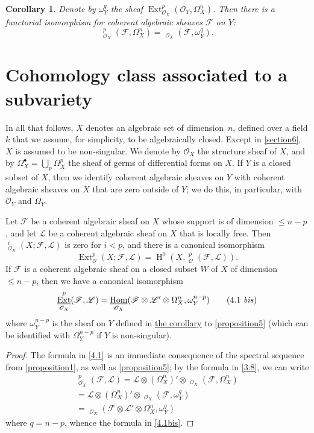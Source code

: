 \documentclass{article}
\theoremstyle{plain}
\newenvironment{lemma}[1]
    {\renewcommand\theinnercustomlemma{#1}\innercustomlemma}
    {\endinnercustomlemma}
\newtheorem*{corollary*}{Corollary}
\theoremstyle{definition}
\newcommand{\sh}{\mathscr}
\renewcommand{\leq}{\leqslant}
\DeclareMathOperator{\Ext}{Ext}
\DeclareMathOperator{\shExt}{\underline{Ext}}
\DeclareMathOperator{\shHom}{\underline{Hom}}
\DeclareMathOperator{\HH}{H}
\newcommand{\oldpage}[1]{\marginpar{\footnotesize$\Big\vert$ \textit{p.~#1}}}
\begin{document}
\begin{corollary*}
\label{proposition5corollary}
  Denote by $\omega_Y^q$ the sheaf $\Ext_{\sh{O}_X}^p(\sh{O}_Y,\Omega_X^n)$.
  Then there is a functorial isomorphism for coherent algebraic sheaves $\sh{F}$ on $Y$:
  \[
  \label{3.8}
    \shExt_{\sh{O}_X}^p(\sh{F},\Omega_X^n) = \shHom_{\sh{O}_X}(\sh{F},\omega_Y^q).
  \tag{3.8}
  \]
\end{corollary*}


\section{Cohomology class associated to a subvariety}
\label{section4}

In all that follows, $X$ denotes an algebraic set of dimension~$n$, defined over a field $k$ that we assume, for simplicity, to be algebraically closed.
Except in \cref{section6}, $X$ is assumed to be non-singular.
We denote by $\sh{O}_X$ the structure sheaf of $X$, and by $\Omega_X^\bullet=\bigcup_p\Omega_X^p$ the sheaf of germs of differential forms on $X$.
If $Y$ is a closed subset of $X$, then we identify coherent algebraic sheaves on $Y$ with coherent algebraic sheaves on $X$ that are zero outside of $Y$;
we do this, in particular, with $\sh{O}_Y$ and $\Omega_Y$.

\begin{lemma}{1}
\label{lemma1}
  Let $\sh{F}$ be a coherent algebraic sheaf on $X$ whose support is of dimension $\leq n-p$, and let $\sh{L}$ be a coherent algebraic sheaf on $X$ that is locally free.
  Then $\shExt_{\sh{O}_X}^i(X;\sh{F},\sh{L})$ is zero for $i<p$, and there is a canonical isomorphism
  \[
  \label{4.1}
    \Ext_\sh{O}^p(X;\sh{F},\sh{L}) = \HH^0(X,\shExt_\sh{O}^p(\sh{F},\sh{L})).
  \tag{4.1}
  \]
  If $\sh{F}$ is a coherent algebraic sheaf on a closed subset $W$ of $X$ of dimension $\leq n-p$, then we have a canonical isomorphism
  \[
  \label{4.1bis}
    \shExt_{\sh{O}_X}^p(\sh{F},\sh{L}) = \shHom_{\sh{O}_X}(\sh{F}\otimes\sh{L}'\otimes\Omega_X^n,\omega_Y^{n-p})
  \tag{4.1 \emph{bis}}
  \]
  where $\omega_Y^{n-p}$ is the sheaf on $Y$ defined in \hyperref[proposition5corollary]{the corollary} to \cref{proposition5} (which can be identified with $\Omega_Y^{n-p}$ if $Y$ is non-singular).
\end{lemma}

\begin{proof}
  The formula in \cref{4.1} is an immediate consequence of the spectral sequence from \cref{proposition1}, as well as \cref{proposition5};
  by the formula in \cref{3.8}, we can write
\oldpage{149-10}
  \[
    \begin{gathered}
      \shExt_{\sh{O}_X}^p(\sh{F},\sh{L})
      = \sh{L}\otimes(\Omega_X^n)'\otimes\shExt_{\sh{O}_X}(\sh{F},\Omega_X^n)
    \\= \sh{L}\otimes(\Omega_X^n)'\otimes\shHom_{\sh{O}_X}(\sh{F},\omega_Y^q)
    \\= \shHom_{\sh{O}_X}(\sh{F}\otimes\sh{L}'\otimes\Omega_X^n,\omega_Y^q)
    \end{gathered}
  \]
  where $q=n-p$, whence the formula in \cref{4.1bis}.
\end{proof}
\end{document}
